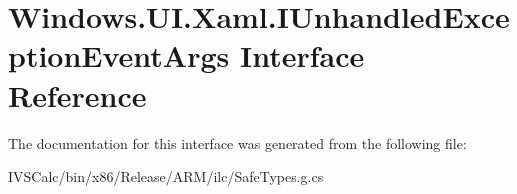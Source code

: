 \hypertarget{interface_windows_1_1_u_i_1_1_xaml_1_1_i_unhandled_exception_event_args}{}\section{Windows.\+U\+I.\+Xaml.\+I\+Unhandled\+Exception\+Event\+Args Interface Reference}
\label{interface_windows_1_1_u_i_1_1_xaml_1_1_i_unhandled_exception_event_args}


The documentation for this interface was generated from the following file\+:\begin{DoxyCompactItemize}
\item 
I\+V\+S\+Calc/bin/x86/\+Release/\+A\+R\+M/ilc/Safe\+Types.\+g.\+cs\end{DoxyCompactItemize}

